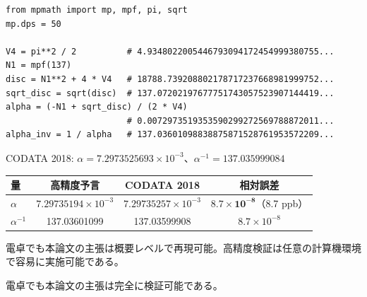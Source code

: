 \documentclass[a4paper,11pt]{ltjsarticle}
\begin{document}
\begin{verbatim}
from mpmath import mp, mpf, pi, sqrt
mp.dps = 50

V4 = pi**2 / 2          # 4.9348022005446793094172454999380755...
N1 = mpf(137)
disc = N1**2 + 4 * V4   # 18788.739208802178717237668981999752...
sqrt_disc = sqrt(disc)  # 137.07202197677751743057523907144419...
alpha = (-N1 + sqrt_disc) / (2 * V4)
                        # 0.0072973519353590299272569788872011...
alpha_inv = 1 / alpha   # 137.03601098838875871528761953572209...
\end{verbatim}

CODATA 2018: $\alpha = 7.2973525693 \times 10^{-3}$、$\alpha^{-1} = 137.035999084$

\begin{center}
\begin{tabular}{lccc}
\toprule
量 & 高精度予言 & CODATA 2018 & 相対誤差 \\
\midrule
$\alpha$ & $7.29735194 \times 10^{-3}$ & $7.29735257 \times 10^{-3}$ & $\mathbf{8.7 \times 10^{-8}}$（8.7 ppb）\\
$\alpha^{-1}$ & 137.03601099 & 137.03599908 & $8.7 \times 10^{-8}$ \\
\bottomrule
\end{tabular}
\end{center}

電卓でも本論文の主張は概要レベルで再現可能。高精度検証は任意の計算機環境で容易に実施可能である。

電卓でも本論文の主張は完全に検証可能である。
\end{document}
